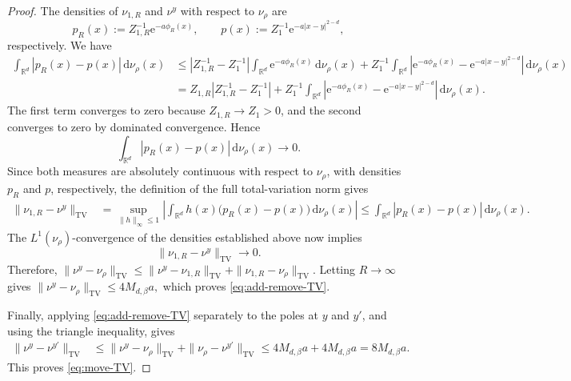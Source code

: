 \documentclass[10pt,a4paper]{amsart}
\newcommand{\R}{\mathbb R}
\newcommand{\TV}{\mathrm{TV}}
\newcommand{\be}{\beta}
\newcommand{\dd}{\,\mathrm d}
\newcommand{\ee}{\mathrm e}
\begin{document}
\begin{proof}
The densities of \(\nu_{1,R}\) and \(\nu^y\) with respect to \(\nu_\rho\)
are
\[
 p_R(x):=Z_{1,R}^{-1}\ee^{-a\phi_R(x)},
 \qquad
 p(x):=Z_1^{-1}\ee^{-a|x-y|^{2-d}},
\]
respectively.  We have
\begin{align*}
 \int_{\R^d}|p_R(x)-p(x)|\dd\nu_\rho(x)
 &\le
 \left|Z_{1,R}^{-1}-Z_1^{-1}\right|
 \int_{\R^d}\ee^{-a\phi_R(x)}\dd\nu_\rho(x)+
 Z_1^{-1}
 \int_{\R^d}
 \left|
 \ee^{-a\phi_R(x)}
 -\ee^{-a|x-y|^{2-d}}
 \right|
 \dd\nu_\rho(x)\\
 &=
 Z_{1,R}\left|Z_{1,R}^{-1}-Z_1^{-1}\right|+Z_1^{-1}
 \int_{\R^d}
 \left|
 \ee^{-a\phi_R(x)}
 -\ee^{-a|x-y|^{2-d}}
 \right|
 \dd\nu_\rho(x).
\end{align*}
The first term converges to zero because \(Z_{1,R}\to Z_1>0\), and the
second converges to zero by dominated convergence.  Hence
\[
 \int_{\R^d}|p_R(x)-p(x)|\dd\nu_\rho(x)\longrightarrow0.
\]
Since both measures are absolutely continuous with respect to \(\nu_\rho\),
with densities \(p_R\) and \(p\), respectively, the definition of the full
total-variation norm gives
\begin{align*}
 \|\nu_{1,R}-\nu^y\|_{\TV}
 &=
 \sup_{\|h\|_\infty\le1}
 \left|
 \int_{\R^d}h(x)\bigl(p_R(x)-p(x)\bigr)\dd\nu_\rho(x)
 \right|\le
 \int_{\R^d}|p_R(x)-p(x)|\dd\nu_\rho(x).
\end{align*}
The \(L^1(\nu_\rho)\)-convergence of the densities established above now
implies
\[
 \|\nu_{1,R}-\nu^y\|_{\TV}\longrightarrow0.
\]
Therefore,  $\|\nu^y-\nu_\rho\|_{\TV}
 \le
 \|\nu^y-\nu_{1,R}\|_{\TV}
 +\|\nu_{1,R}-\nu_\rho\|_{\TV}.$
Letting \(R\to\infty\) gives $\|\nu^y-\nu_\rho\|_{\TV}
 \le4M_{d,\be}a,$
which proves \eqref{eq:add-remove-TV}.

Finally, applying \eqref{eq:add-remove-TV} separately to the poles at
\(y\) and \(y'\), and using the triangle inequality, gives
\begin{align*}
 \|\nu^y-\nu^{y'}\|_{\TV}
 &\le
 \|\nu^y-\nu_\rho\|_{\TV}
 +\|\nu_\rho-\nu^{y'}\|_{\TV}\le
 4M_{d,\be}a+4M_{d,\be}a=8M_{d,\be}a.
\end{align*}
This proves \eqref{eq:move-TV}.
\end{proof}
\end{document}
